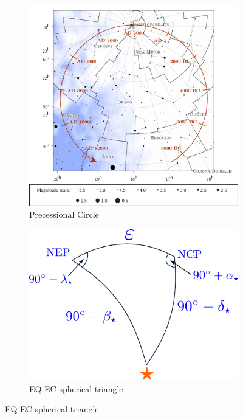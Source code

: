 \documentclass[a4paper,12pt]{extarticle}
\begin{document}
\begin{figure}[H]
	\centering
	\begin{subfigure}{0.6\linewidth}
		\includegraphics[width=\linewidth]{presc1.png}
		\caption{Precessional Circle}
		\label{pcircle}
	\end{subfigure}
	\begin{subfigure}{0.35\linewidth}
		\includegraphics[width=\linewidth]{potd65a.pdf}
		\caption{EQ-EC spherical triangle}
		\label{sphere_eqec}
		\vspace{3cm}
	\end{subfigure}
\end{figure}
\end{document}
